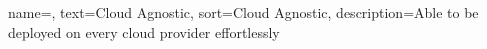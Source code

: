 

 {
    name=,
    text=Cloud Agnostic,
    sort=Cloud Agnostic,
    description={Able to be deployed on every cloud provider effortlessly}
}

